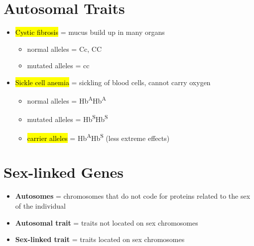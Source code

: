 \documentclass[a4paper,12pt]{article}
\begin{document}
\section{Autosomal Traits}
\begin{itemize}
\item{
        \hl{Cystic fibrosis} = mucus build up in many organs
        \begin{itemize}
            \item{normal alleles = Cc, CC}
            \item{mutated alleles = cc}
        \end{itemize}
    }
                \item{
                        \hl{Sickle cell anemia} = sickling of blood cells, cannot carry oxygen
                        \begin{itemize}
                            \item{normal alleles = Hb\textsuperscript{A}Hb\textsuperscript{A}}
                            \item{mutated alleles = Hb\textsuperscript{S}Hb\textsuperscript{S}}
                            \item{\hl{carrier alleles} = Hb\textsuperscript{A}Hb\textsuperscript{S} (less extreme effects)}
                        \end{itemize}
                    }
\end{itemize}

\section{Sex-linked Genes}
\begin{itemize}
    \item{\textbf{Autosomes} = chromosomes that do not code for proteins related to the sex of the individual}
    \item{\textbf{Autosomal trait} = traits not located on sex chromosomes}
    \item{\textbf{Sex-linked trait} = traits located on sex chromosomes}
\end{itemize}
\end{document}

